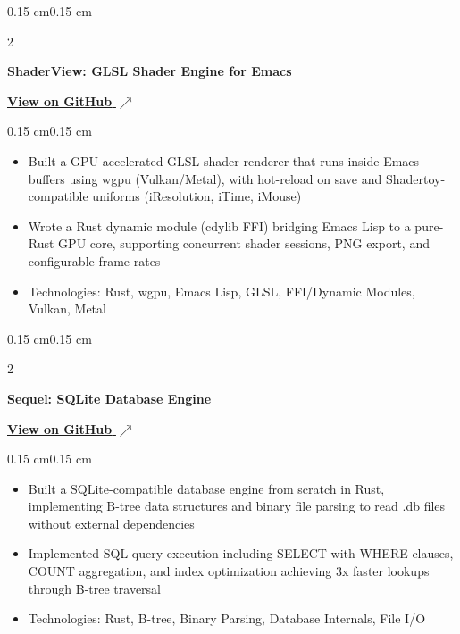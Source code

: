 \documentclass[10pt, letterpaper]{article}
\newcommand{\githublink}[2]{\href{#1}{#2 $\nearrow$}}
\newenvironment{highlights}{
    \begin{itemize}[
        topsep=0.08 cm,
        parsep=0.05 cm,
        partopsep=0pt,
        itemsep=0pt,
        leftmargin=0.4 cm
    ]
}{
    \end{itemize}
}
\newenvironment{onecolentry}{
    \begin{adjustwidth}{0.15 cm}{0.15 cm}
}{
    \end{adjustwidth}
}
\newenvironment{twocolentry}[2][]{
    \onecolentry
    \def\secondColumn{#2}
    \setcolumnwidth{\fill, 4.5 cm}
    \begin{paracol}{2}
}{
    \switchcolumn \raggedleft \secondColumn
    \end{paracol}
    \endonecolentry
}
\begin{document}
        \vspace{0.15 cm}

        \begin{twocolentry}{
            \githublink{https://github.com/yuann3/shaderview}{\textbf{View on GitHub}}
        }
            \textbf{ShaderView: GLSL Shader Engine for Emacs}
        \end{twocolentry}
        \vspace{0.08 cm}
        \begin{onecolentry}
            \begin{highlights}
                \item Built a GPU-accelerated GLSL shader renderer that runs inside Emacs buffers using wgpu (Vulkan/Metal), with hot-reload on save and Shadertoy-compatible uniforms (iResolution, iTime, iMouse)
                \item Wrote a Rust dynamic module (cdylib FFI) bridging Emacs Lisp to a pure-Rust GPU core, supporting concurrent shader sessions, PNG export, and configurable frame rates
                \item Technologies: Rust, wgpu, Emacs Lisp, GLSL, FFI/Dynamic Modules, Vulkan, Metal
            \end{highlights}
        \end{onecolentry}

        \vspace{0.15 cm}
    
        \begin{twocolentry}{
            \githublink{https://github.com/yuann3/sequel/}{\textbf{View on GitHub}}
        }
            \textbf{Sequel: SQLite Database Engine}
        \end{twocolentry}
        \vspace{0.08 cm}
        \begin{onecolentry}
            \begin{highlights}
                \item Built a SQLite-compatible database engine from scratch in Rust, implementing B-tree data structures and binary file parsing to read .db files without external dependencies
                \item Implemented SQL query execution including SELECT with WHERE clauses, COUNT aggregation, and index optimization achieving 3x faster lookups through B-tree traversal
                \item Technologies: Rust, B-tree, Binary Parsing, Database Internals, File I/O
            \end{highlights}
        \end{onecolentry}
\end{document}
